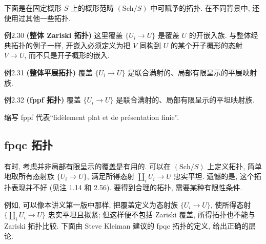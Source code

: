 下面是在固定概形 $S$ 上的概形范畴 $(\mathrm{Sch}/S)$ 中可赋予的拓扑. 在不同背景中, 还使用过其他一些拓扑.

\begin{origstatement}{例}{2.30}\label{ch02:ex230}
\textbf{(整体 Zariski 拓扑)} 这里覆盖 $\{U_i\to U\}$ 是覆盖 $U$ 的开嵌入族. 与整体经典拓扑的例子一样, 开嵌入必须定义为把 $V$ 同构到 $U$ 的某个开子概形的态射 $V\to U$, 而不只是开子概形的嵌入.
\end{origstatement}

\begin{origstatement}{例}{2.31}\label{ch02:ex231}
\textbf{(整体平展拓扑)} 覆盖 $\{U_i\to U\}$ 是联合满射的、局部有限呈示的平展映射族.
\end{origstatement}

\begin{origstatement}{例}{2.32}\label{ch02:ex232}
\textbf{(fppf 拓扑)} 覆盖 $\{U_i\to U\}$ 是联合满射的、局部有限呈示的平坦映射族.

缩写 fppf 代表“fidèlement plat et de présentation finie”.
\end{origstatement}

\subsection{fpqc 拓扑}\label{ch02:sec232}
有时, 考虑并非局部有限呈示的覆盖是有用的. 可以在 $(\mathrm{Sch}/S)$ 上定义拓扑, 简单地取所有态射族 $\{U_i\to U\}$, 满足所得态射 $\coprod_iU_i\to U$ 忠实平坦. 遗憾的是, 这个拓扑表现并不好 (见注 1.14 和 2.56). 要得到合理的拓扑, 需要某种有限性条件.

例如, 可以像本讲义第一版中那样, 把覆盖定义为态射族 $\{U_i\to U\}$, 使所得态射 $\{\coprod_iU_i\to U\}$ 忠实平坦且拟紧; 但这样便不包括 Zariski 覆盖, 所得拓扑也不能与 Zariski 拓扑比较. 下面由 Steve Kleiman 建议的 fpqc 拓扑的定义, 给出正确的层论.

